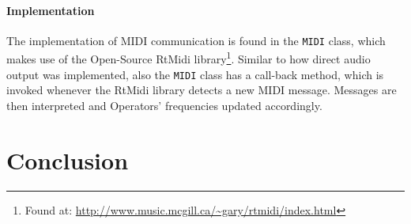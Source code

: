 \documentclass[12pt,twoside]{report}
\begin{document}
\subsubsection{Implementation}

The implementation of MIDI communication is found in the \texttt{MIDI} class, which makes use of the Open-Source RtMidi library\footnote{Found at: \url{http://www.music.mcgill.ca/~gary/rtmidi/index.html}}. Similar to how direct audio output was implemented, also the \texttt{MIDI} class has a call-back method, which is invoked whenever the RtMidi library detects a new MIDI message. Messages are then interpreted and Operators' frequencies updated accordingly.

\chapter{Conclusion}
\end{document}
